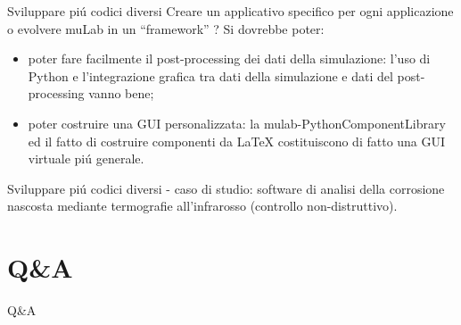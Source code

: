 \documentclass{beamer}
\begin{document}
\begin{frame}{Sviluppare pi\'u codici diversi}
Creare un applicativo specifico per ogni applicazione o evolvere muLab in un ``framework'' ? 
Si dovrebbe poter:
\begin{itemize}
\item poter fare facilmente il post-processing dei dati della simulazione: l'uso di Python e l'integrazione grafica tra dati della
simulazione e dati del post-processing vanno bene;
\item poter costruire una GUI personalizzata: la mulab-PythonComponentLibrary ed il fatto di costruire componenti da LaTeX 
costituiscono di fatto una GUI virtuale pi\'u generale.
\end{itemize}
\end{frame}

\begin{frame}{Sviluppare pi\'u codici diversi}
- caso di studio: software di analisi della corrosione nascosta mediante termografie all'infrarosso (controllo non-distruttivo).
\end{frame}

\section{Q\&A}
\begin{frame}{Q\&A}
\end{frame}
\end{document}
